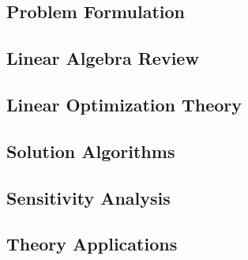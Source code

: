 \documentclass[letter,12pt]{book}
\renewcommand{\0}{\mathbf{0}}
\begin{document}
\subsection{Problem Formulation} 


\subsection{Linear Algebra Review} 


\subsection{Linear Optimization Theory} 


\subsection{Solution Algorithms}  


\subsection{Sensitivity Analysis} 


\subsection{Theory Applications} 


%
%
%
%
%
%
%
%
%

%
%
%
%
%
%
%
%
%
\end{document}
